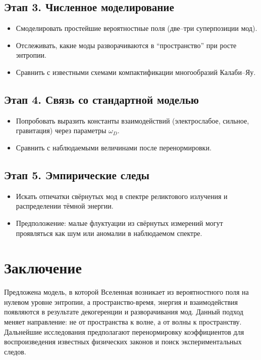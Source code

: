 \documentclass[12pt,a4paper]{article}
\begin{document}
\subsection*{Этап 3. Численное моделирование}
\begin{itemize}
  \item Смоделировать простейшие вероятностные поля (две–три суперпозиции мод).
  \item Отслеживать, какие моды разворачиваются в ``пространство'' при росте энтропии.
  \item Сравнить с известными схемами компактификации многообразий Калаби–Яу.
\end{itemize}

\subsection*{Этап 4. Связь со стандартной моделью}
\begin{itemize}
  \item Попробовать выразить константы взаимодействий (электрослабое, сильное, гравитация) через параметры $\omega_D$.
  \item Сравнить с наблюдаемыми величинами после перенормировки.
\end{itemize}

\subsection*{Этап 5. Эмпирические следы}
\begin{itemize}
  \item Искать отпечатки свёрнутых мод в спектре реликтового излучения и распределении тёмной энергии.
  \item Предположение: малые флуктуации из свёрнутых измерений могут проявляться как шум или аномалии в наблюдаемом спектре.
\end{itemize}

\section{Заключение}
Предложена модель, в которой Вселенная возникает из вероятностного поля на нулевом уровне энтропии, а пространство-время, энергия и взаимодействия появляются в результате декогеренции и разворачивания мод. Данный подход меняет направление: не от пространства к волне, а от волны к пространству. Дальнейшие исследования предполагают перенормировку коэффициентов для воспроизведения известных физических законов и поиск экспериментальных следов.
\end{document}
